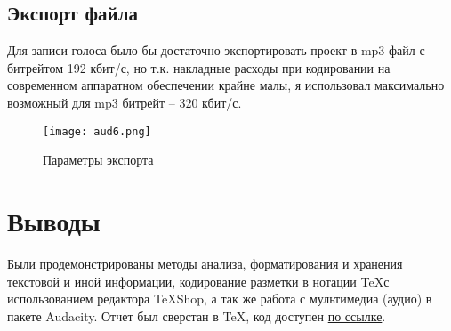 \documentclass[a4paper]{article}
\begin{document}
\subsection{Экспорт файла}
Для записи голоса было бы достаточно экспортировать проект в mp3-файл с битрейтом 192 кбит/с, но т.к. накладные расходы при кодировании на современном аппаратном обеспечении крайне малы, я использовал максимально возможный для mp3 битрейт – 320 кбит/с.
\begin{figure}[h]
	\centering
	\texttt{[image: aud6.png]}
	\caption{Параметры экспорта}
	\label{fig:mesh7}
\end{figure}

\thispagestyle{empty}
\newpage
\section{Выводы}
Были продемонстрированы методы анализа, форматирования и хранения текстовой и иной информации, кодирование разметки в нотации \TeX с использованием редактора \TeX Shop, а так же работа с мультимедиа (аудио) в пакете Audacity. 
Отчет был сверстан в \TeX, код доступен \href{https://github.com/mammuthus/SUAI-Stuff/blob/main/LaTeX_LR1.tex}{по ссылке}.
\thispagestyle{empty}
\end{document}
